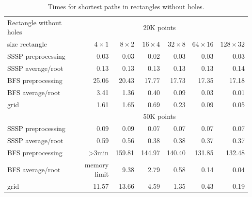 \documentclass[a4paper,USenglish]{lipics}
\begin{document}
\begin{table}
\begin{tabular}{l*{6}{r}}
Rectangle without holes & \multicolumn{6}{c}{20K points}\\						
size rectangle	&	$4\times 1$	&	$8\times 2$	&	$16\times 4$	&	$32\times 8$	&	$64\times 16$	&	$128\times 32$	\\
\hline
SSSP preprocessing	&	0.03	&	0.03	&	0.02	&	0.03	&	0.03	&	0.03	\\
SSSP average/root	&	0.13	&	0.13	&	0.13	&	0.13	&	0.13	&	0.14	\\
BFS preprocessing	&	25.06	&	20.43	&	17.77	&	17.73	&	17.35	&	17.18	\\
BFS average/root	&	3.41	&	1.36	&	0.40	&	0.09	&	0.03	&	0.01	\\
grid				&	1.61	&	1.65	&	0.69	&	0.23	&	0.09	&	0.05\vspace{.2cm}	\\
\hline
  & \multicolumn{6}{c}{50K points}\\						
\hline
SSSP preprocessing	&	0.09	&	0.09	&	0.07	&	0.07	&	0.07	&	0.07	\\
SSSP average/root	&	0.59	&	0.56	&	0.38	&	0.38	&	0.37	&	0.37	\\
BFS preprocessing	&	>3min	&	159.81	&	144.97	&	140.40	&	131.85	&	132.48	\\
BFS average/root	&	memory limit	&	9.38	&	2.79	&	0.58	&	0.14	&	0.04	\\
grid				&	11.57	&	13.66	&	4.59	&	1.35	&	0.43	&	0.19
\end{tabular}
\caption{Times for shortest paths in rectangles without holes.}
\label{table1}
\end{table}
\end{document}
